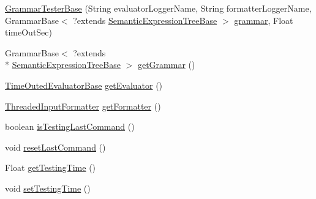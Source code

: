 \begin{DoxyCompactItemize}
\item 
\hyperlink{classit_1_1emarolab_1_1cagg_1_1core_1_1evaluation_1_1interfacing_1_1GrammarTesterBase_a33a25eaf67a74116b3cde14ceb4ff207}{Grammar\-Tester\-Base} (String evaluator\-Logger\-Name, String formatter\-Logger\-Name, Grammar\-Base$<$ ?extends \hyperlink{interfaceit_1_1emarolab_1_1cagg_1_1core_1_1evaluation_1_1semanticGrammar_1_1syntaxCompiler_1_1SemanticExpressionTreeBase}{Semantic\-Expression\-Tree\-Base} $>$ \hyperlink{classit_1_1emarolab_1_1cagg_1_1core_1_1evaluation_1_1interfacing_1_1GrammarTesterBase_ac6601808f37ef4327e6308143f01dc6a}{grammar}, Float time\-Out\-Sec)
\item 
Grammar\-Base$<$ ?extends \\*
\hyperlink{interfaceit_1_1emarolab_1_1cagg_1_1core_1_1evaluation_1_1semanticGrammar_1_1syntaxCompiler_1_1SemanticExpressionTreeBase}{Semantic\-Expression\-Tree\-Base} $>$ \hyperlink{classit_1_1emarolab_1_1cagg_1_1core_1_1evaluation_1_1interfacing_1_1GrammarTesterBase_a4b4b28e17714d53310b5a02e83f702b2}{get\-Grammar} ()
\item 
\hyperlink{classit_1_1emarolab_1_1cagg_1_1core_1_1evaluation_1_1interfacing_1_1TimeOutedEvaluatorBase}{Time\-Outed\-Evaluator\-Base} \hyperlink{classit_1_1emarolab_1_1cagg_1_1core_1_1evaluation_1_1interfacing_1_1GrammarTesterBase_ac73b2e27aa3599a364b6157437deb669}{get\-Evaluator} ()
\item 
\hyperlink{classit_1_1emarolab_1_1cagg_1_1core_1_1evaluation_1_1inputFormatting_1_1ThreadedInputFormatter}{Threaded\-Input\-Formatter} \hyperlink{classit_1_1emarolab_1_1cagg_1_1core_1_1evaluation_1_1interfacing_1_1GrammarTesterBase_a6ef95145ca7fc47e8417df3cb7e5a77a}{get\-Formatter} ()
\item 
boolean \hyperlink{classit_1_1emarolab_1_1cagg_1_1core_1_1evaluation_1_1interfacing_1_1GrammarTesterBase_a3110a613ab7fff614461997e4d67698c}{is\-Testing\-Last\-Command} ()
\item 
void \hyperlink{classit_1_1emarolab_1_1cagg_1_1core_1_1evaluation_1_1interfacing_1_1GrammarTesterBase_a27ea53b561e02b8ee2a259e0507510a5}{reset\-Last\-Command} ()
\item 
Float \hyperlink{classit_1_1emarolab_1_1cagg_1_1core_1_1evaluation_1_1interfacing_1_1GrammarTesterBase_af07c95a2936d769f971a0f703fdd74f1}{get\-Testing\-Time} ()
\item 
void \hyperlink{classit_1_1emarolab_1_1cagg_1_1core_1_1evaluation_1_1interfacing_1_1GrammarTesterBase_a24a9dac583ff82caeb26be637940b0c2}{set\-Testing\-Time} ()
\item 

\end{DoxyCompactItemize}
